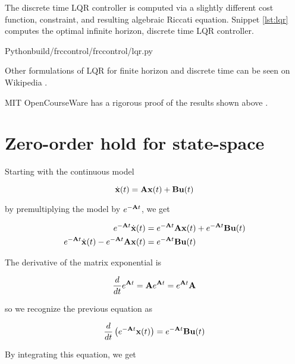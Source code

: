 The discrete time LQR \gls{controller} is computed via a slightly different cost
function, constraint, and resulting algebraic Riccati equation. Snippet
\ref{lst:lqr} computes the optimal infinite horizon, discrete time LQR
\gls{controller}.

\begin{code}{Python}{build/frccontrol/frccontrol/lqr.py}
  \caption{Infinite horizon, discrete time LQR computation in Python}
  \label{lst:lqr}
\end{code}

Other formulations of LQR for finite horizon and discrete time can be seen on
Wikipedia \cite{bib:wiki_lqr}.

MIT OpenCourseWare has a rigorous proof of the results shown above
\cite{bib:lqr_derivs}.

\section{Zero-order hold for state-space}
\label{sec:deriv_zoh_ss}

Starting with the continuous \gls{model}

\begin{equation*}
  \dot{\mathbf{x}}(t) = \mathbf{A}\mathbf{x}(t) + \mathbf{B}\mathbf{u}(t)
\end{equation*}

by premultiplying the \gls{model} by $e^{-\mathbf{A}t}$, we get

\begin{align*}
  e^{-\mathbf{A}t}\dot{\mathbf{x}}(t) &= e^{-\mathbf{A}t}\mathbf{A}\mathbf{x}(t) +
    e^{-\mathbf{A}t}\mathbf{B}\mathbf{u}(t) \\
  e^{-\mathbf{A}t}\dot{\mathbf{x}}(t) - e^{-\mathbf{A}t}\mathbf{A}\mathbf{x}(t) &=
    e^{-\mathbf{A}t}\mathbf{B}\mathbf{u}(t)
\end{align*}

The derivative of the matrix exponential is

\begin{equation*}
  \frac{d}{dt}e^{\mathbf{A}t} = \mathbf{A}e^{\mathbf{A}t} = e^{\mathbf{A}t}\mathbf{A}
\end{equation*}

so we recognize the previous equation as

\begin{equation*}
  \frac{d}{dt}\left(e^{-\mathbf{A}t}\mathbf{x}(t)\right) =
    e^{-\mathbf{A}t}\mathbf{B}\mathbf{u}(t)
\end{equation*}

By integrating this equation, we get

